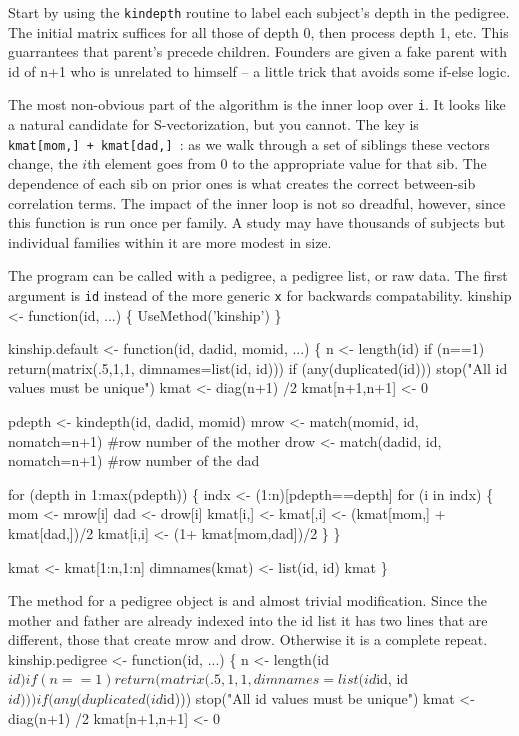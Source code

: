 \documentclass{article}
\begin{document}
Start by using the {\tt{}kindepth} routine to label each subject's depth in   %
the pedigree.  
The initial matrix suffices for all those of depth 0, then process
depth 1, etc.
This guarrantees that parent's precede children.                            %
Founders are given a fake parent with id of n+1 who is unrelated to 
himself -- a little trick that avoids some if-else logic.

The most non-obvious part of the algorithm is the inner loop over {\tt{}i}.
It looks like a natural candidate for S-vectorization, but you cannot.
The key is {\tt{}kmat[mom,]\ +\ kmat[dad,]\ }: as we walk through a set of
siblings these vectors change, the $i$th element goes from 0 to the
appropriate value for that sib.  The dependence of each sib on prior
ones is what creates the correct between-sib correlation terms. 
The impact of the inner loop is not so dreadful, however, since this
function is run once per family.  A study may have thousands of
subjects but individual families within it are more modest in size.

The program can be called with a pedigree, a pedigree list, or
raw data.  The first argument is {\tt{}id} instead of the more generic {\tt{}x}
for backwards compatability.
\nwenddocs{}\endmoddef
kinship <- function(id, ...) \{
    UseMethod('kinship')
    \}

kinship.default <- function(id, dadid, momid, ...) \{
    n <- length(id)
    if (n==1) 
        return(matrix(.5,1,1, dimnames=list(id, id)))
    if (any(duplicated(id))) stop("All id values must be unique")
    kmat <- diag(n+1) /2
    kmat[n+1,n+1]    <- 0 

    pdepth <- kindepth(id, dadid, momid)
    mrow <- match(momid, id, nomatch=n+1) #row number of the mother
    drow <- match(dadid, id, nomatch=n+1) #row number of the dad 

    for (depth in 1:max(pdepth)) \{
        indx <- (1:n)[pdepth==depth]
        for (i in indx) \{
            mom <- mrow[i]
            dad <- drow[i]
            kmat[i,]  <- kmat[,i] <- (kmat[mom,] + kmat[dad,])/2
            kmat[i,i] <- (1+ kmat[mom,dad])/2
            \}
        \}
    
    kmat <- kmat[1:n,1:n]
    dimnames(kmat) <- list(id, id)
    kmat
    \}
\nwendcode{}\nwdocspar

The method for a pedigree object is and almost trivial modification.  Since the
mother and father are already indexed into the id list it has 
two lines that are different, those that create mrow and drow.
Otherwise it is a complete repeat.
\nwenddocs{}\plusendmoddef
kinship.pedigree <- function(id, ...) \{
    n <- length(id$id)
    if (n==1) 
        return(matrix(.5,1,1, dimnames=list(id$id, id$id)))
    if (any(duplicated(id$id))) stop("All id values must be unique")
    kmat <- diag(n+1) /2
    kmat[n+1,n+1]    <- 0 
\end{document}
